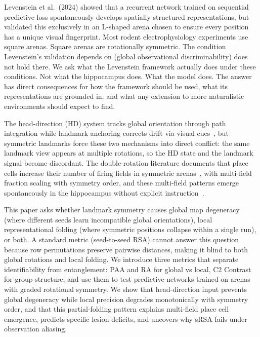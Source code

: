 \documentclass[11pt, a4paper]{article}
\begin{document}
Levenstein et al.~(2024) showed that a recurrent network trained on sequential predictive loss spontaneously develops spatially structured representations, but validated this exclusively in an L-shaped arena chosen to ensure every position has a unique visual fingerprint. Most rodent electrophysiology experiments use square arenas. Square arenas are rotationally symmetric. The condition Levenstein's validation depends on (global observational discriminability) does not hold there. We ask what the Levenstein framework actually does under these conditions. Not what the hippocampus does. What the model does. The answer has direct consequences for how the framework should be used, what its representations are grounded in, and what any extension to more naturalistic environments should expect to find.

The head-direction (HD) system tracks global orientation through path integration while landmark anchoring corrects drift via visual cues~\cite{taube1990, knierim1995}, but symmetric landmarks force these two mechanisms into direct conflict: the same landmark view appears at multiple rotations, so the HD state and the landmark signal become discordant. The double-rotation literature documents that place cells increase their number of firing fields in symmetric arenas~\cite{muller1987, knierim1995}, with multi-field fraction scaling with symmetry order, and these multi-field patterns emerge spontaneously in the hippocampus without explicit instruction~\cite{leutgeb2005}.

This paper asks whether landmark symmetry causes global map degeneracy (where different seeds learn incompatible global orientations), local representational folding (where symmetric positions collapse within a single run), or both. A standard metric (seed-to-seed RSA) cannot answer this question because row permutations preserve pairwise distances, making it blind to both global rotations and local folding. We introduce three metrics that separate identifiability from entanglement: PAA and RA for global vs local, C2 Contrast for group structure, and use them to test predictive networks trained on arenas with graded rotational symmetry. We show that head-direction input prevents global degeneracy while local precision degrades monotonically with symmetry order, and that this partial-folding pattern explains multi-field place cell emergence, predicts specific lesion deficits, and uncovers why sRSA fails under observation aliasing.
\end{document}
